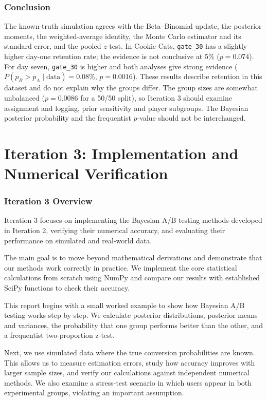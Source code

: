 \documentclass[11pt]{article}
\begin{document}
\section{Conclusion}
The known-truth simulation agrees with the Beta--Binomial update, the posterior moments, the weighted-average identity, the Monte Carlo estimator and its standard error, and the pooled $z$-test. In Cookie Cats, \texttt{gate\_30} has a slightly higher day-one retention rate; the evidence is not conclusive at 5\% ($p=0.074$). For day seven, \texttt{gate\_30} is higher and both analyses give strong evidence ($P(p_B>p_A\mid\text{data})=0.08\%$, $p=0.0016$). These results describe retention in this dataset and do not explain why the groups differ. The group sizes are somewhat unbalanced ($p=0.0086$ for a 50/50 split), so Iteration 3 should examine assignment and logging, prior sensitivity and player subgroups. The Bayesian posterior probability and the frequentist $p$-value should not be interchanged.



\clearpage
\part*{Iteration 3: Implementation and Numerical Verification}

\section{Iteration 3 Overview}

Iteration 3 focuses on implementing the Bayesian A/B testing
methods developed in Iteration 2, verifying their numerical
accuracy, and evaluating their performance on simulated and
real-world data.

The main goal is to move beyond mathematical derivations
and demonstrate that our methods work correctly in practice.
We implement the core statistical calculations from scratch
using NumPy and compare our results with established SciPy
functions to check their accuracy.

This report begins with a small worked example to show
how Bayesian A/B testing works step by step. We calculate
posterior distributions, posterior means and variances,
the probability that one group performs better than the
other, and a frequentist two-proportion z-test.

Next, we use simulated data where the true conversion
probabilities are known. This allows us to measure
estimation errors, study how accuracy improves with
larger sample sizes, and verify our calculations against
independent numerical methods. We also examine a
stress-test scenario in which users appear in both
experimental groups, violating an important assumption.
\end{document}
